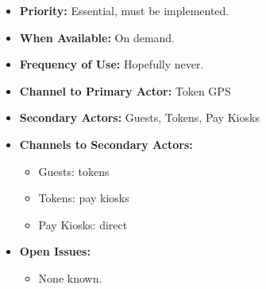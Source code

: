 \documentclass[12pt]{article}
\begin{document}
\begin{itemize}
        \item[]\textbf{Priority:}
            Essential, must be implemented.
            
        \item[]\textbf{When Available:}
            On demand.

        \item[]\textbf{Frequency of Use:}
            Hopefully never.

        \item[]\textbf{Channel to Primary Actor:}
            Token GPS

        \item[]\textbf{Secondary Actors:}
            Guests, Tokens, Pay Kiosks

        \item[]\textbf{Channels to Secondary Actors:}
            \begin{itemize}
                \item[] Guests: tokens
                \item[] Tokens: pay kiosks
                \item[] Pay Kiosks: direct
            \end{itemize}

        \item[]\textbf{Open Issues:}
            \begin{itemize}
                \item[] None known.
            \end{itemize}
    \end{itemize}
        
\end{document}
